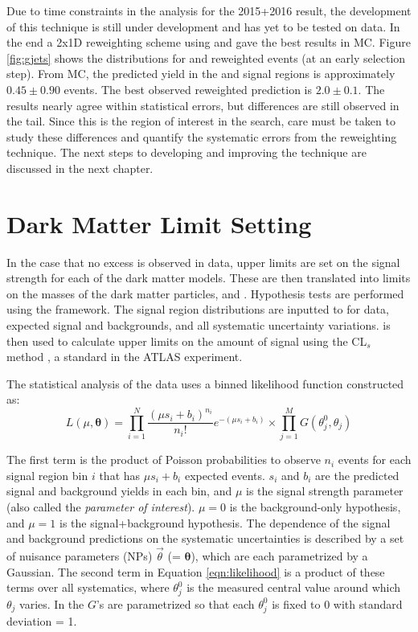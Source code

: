 Due to time constraints in the analysis for the 2015+2016 result, the development of this technique is still under development and has yet to be tested on data. In the end a 2x1D reweighting scheme using \pt and \etmissht gave the best results in MC. Figure \ref{fig:gjets} shows the \etmiss distributions for \Zjets and reweighted \gjets events (at an early selection step). From \Zjets MC, the predicted yield in the \ee and \mm signal regions is approximately $0.45 \pm 0.90$ events. The best observed reweighted \gjets prediction is $2.0 \pm 0.1$. The results nearly agree within statistical errors, but differences are still observed in the \etmiss tail. Since this is the region of interest in the \monoZ search, care must be taken to study these differences and quantify the systematic errors from the reweighting technique. The next steps to developing and improving the \gjets technique are discussed in the next chapter.

\section{Dark Matter Limit Setting}
\label{sec:limits}

In the case that no excess is observed in data, upper limits are set on the signal strength for each of the dark matter models. These are then translated into limits on the masses of the dark matter particles, \mchi and \mmed. Hypothesis tests are performed using the \histfitter \cite{Baak:2014wma} framework. The signal region \etmiss distributions are inputted to \histfitter for data, expected signal and backgrounds, and all systematic uncertainty variations. \histfitter is then used to calculate upper limits on the amount of signal using the CL$_{s}$ method \cite{Cowan:2010js}, a standard in the ATLAS experiment. 

The statistical analysis of the data uses a binned likelihood function constructed as:
\begin{equation}
L(\mu,\boldsymbol{\theta}) = \prod_{i=1}^N \frac{(\mu s_i + b_i)^{n_i}}{n_i !} e^{-(\mu s_i + b_i)} \times \prod_{j=1}^M G(\theta_j^0, \theta_j)
\label{eqn:likelihood}
\end{equation}

\noindent The first term is the product of Poisson probabilities to observe $n_i$ events for each signal region bin $i$ that has $\mu s_i + b_i$ expected events. $s_i$ and $b_i$ are the predicted signal and background yields in each bin, and $\mu$ is the signal strength parameter (also called the \textit{parameter of interest}). $\mu=0$ is the background-only hypothesis, and $\mu=1$ is the signal+background hypothesis. The dependence of the signal and background predictions on the systematic uncertainties is described by a set of nuisance parameters (NPs) $\vec{\theta}$ (= $\boldsymbol{\theta}$), which are each parametrized by a Gaussian. The second term in Equation \ref{eqn:likelihood} is a product of these terms over all systematics, where $\theta_j^0$ is the measured central value around which $\theta_j$ varies. In \histfitter the $G$'s are parametrized so that each $\theta_j^0$ is fixed to 0 with standard deviation = 1.

